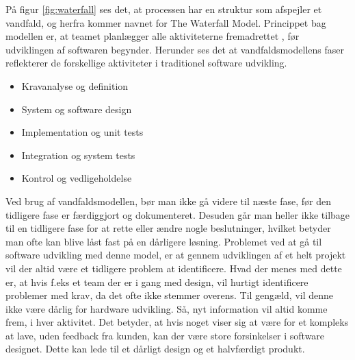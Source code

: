 På figur \ref{fig:waterfall} ses det, at processen har en struktur som afspejler et vandfald, og herfra kommer navnet for The Waterfall Model. Princippet bag modellen er, at teamet planlægger alle aktiviteterne fremadrettet , før udviklingen af softwaren begynder. Herunder ses det at vandfaldsmodellens faser reflekterer de forskellige aktiviteter i traditionel software udvikling.\cite{Sommerville} 
\begin{itemize}
    \item Kravanalyse og definition
    \item System og software design
    \item Implementation og unit tests
    \item Integration og system tests
    \item Kontrol og vedligeholdelse 
\end{itemize}

Ved brug af vandfaldsmodellen, bør man ikke gå videre til næste fase, før den tidligere fase er færdiggjort og dokumenteret. Desuden går man heller ikke tilbage til en tidligere fase for at rette eller ændre nogle beslutninger, hvilket betyder man ofte kan blive låst fast på en dårligere løsning. Problemet ved at gå til software udvikling med denne model, er at gennem udviklingen af et helt projekt vil der altid være et tidligere problem at identificere. Hvad der menes med dette er, at hvis f.eks et team der er i gang med design, vil hurtigt identificere problemer med krav, da det ofte ikke stemmer overens. Til gengæld, vil denne ikke være dårlig for hardware udvikling. Så, nyt information vil altid komme frem, i hver aktivitet. Det betyder, at hvis noget viser sig at være for et kompleks at lave, uden feedback fra kunden, kan der være store forsinkelser i software designet. Dette kan lede til et dårligt design og et halvfærdigt produkt.\cite{Sommerville} 

